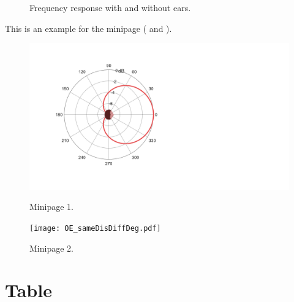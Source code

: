 \begin{figure}[t]
\centering
{}
\caption{Frequency response with and without ears.}
\label{fig:subfigure}
\end{figure}


This is an example for the minipage ( and ).

\begin{figure}[t]
\begin{minipage}{0.48\linewidth}
        \centering
		\includegraphics[width=0.58\columnwidth]{Figures/OE_cardioid.pdf}
		\caption{Minipage 1.}
		\label{fig:minipage1}
\end{minipage}
\hspace{5pt}
\begin{minipage}{0.48\linewidth}
        \centering
		\texttt{[image: OE\_sameDisDiffDeg.pdf]}
		\caption{Minipage 2.}
		\label{fig:minipage2}
\end{minipage}
\end{figure}

\section{Table}


